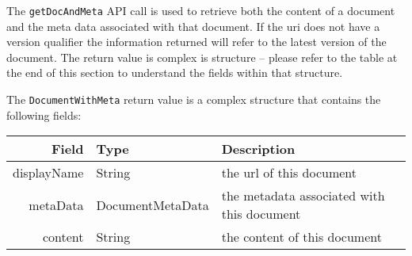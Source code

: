 The \verb+getDocAndMeta+ API call is used to retrieve both the content of
a document and the meta data associated with that document. If the uri does
not have a version qualifier the information returned will refer to the latest
version of the document. The return value is complex is structure -- please
refer to the table at the end of this section to understand the fields within that
structure.

The \verb+DocumentWithMeta+ return value is a complex structure that contains
the following fields:

\begin{table}[h]
\begin{center}
\begin{tabular}{rl p{8cm}}
  Field & Type & Description \\
  \hline
  displayName & String & the url of this document \\
  metaData & DocumentMetaData & the metadata associated with this document \\
  content & String & the content of this document \\
\end{tabular}
\end{center}
\end{table}
